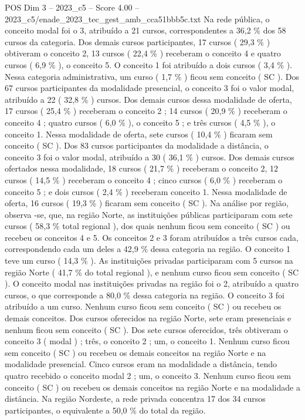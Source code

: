 \begin{textsample}{POS Dim 3 – 2023\_c5 – Score 4.00 – 2023\_c5/enade\_2023\_tec\_gest\_amb\_cca51bbb5c.txt}
Na rede pública, o conceito modal foi o 3, atribuído a 21 cursos, correspondentes a 36,2 \% dos 58 cursos da categoria.
Dos demais cursos participantes, 17 cursos ( 29,3 \% ) obtiveram o conceito 2, 13 cursos ( 22,4 \% ) receberam o conceito 4 e quatro cursos ( 6,9 \% ), o conceito 5.
O conceito 1 foi atribuído a dois cursos ( 3,4 \% ).
Nessa categoria administrativa, um curso ( 1,7 \% ) ficou sem conceito ( SC ).
Dos 67 cursos participantes da modalidade presencial, o conceito 3 foi o valor modal, atribuído a 22 ( 32,8 \% ) cursos.
Dos demais cursos dessa modalidade de oferta, 17 cursos ( 25,4 \% ) receberam o conceito 2 ; 14 cursos ( 20,9 \% ) receberam o conceito 4 ; quatro cursos ( 6,0 \% ), o conceito 5 ; e três cursos ( 4,5 \% ), o conceito 1.
Nessa modalidade de oferta, sete cursos ( 10,4 \% ) ficaram sem conceito ( SC ).
Dos 83 cursos participantes da modalidade a distância, o conceito 3 foi o valor modal, atribuído a 30 ( 36,1 \% ) cursos.
Dos demais cursos ofertados nessa modalidade, 18 cursos ( 21,7 \% ) receberam o conceito 2, 12 cursos ( 14,5 \% ) receberam o conceito 4 ; cinco cursos ( 6,0 \% ) receberam o conceito 5 ; e dois cursos ( 2,4 \% ) receberam conceito 1.
Nessa modalidade de oferta, 16 cursos ( 19,3 \% ) ficaram sem conceito ( SC ).
Na análise por região, observa -se, que, na região Norte, as instituições públicas participaram com sete cursos ( 58,3 \% total regional ), dos quais nenhum ficou sem conceito ( SC ) ou recebeu os conceitos 4 e 5.
Os conceitos 2 e 3 foram atribuídos a três cursos cada, correspondendo cada um deles a 42,9 \% dessa categoria na região.
O conceito 1 teve um curso ( 14,3 \% ).
As instituições privadas participaram com 5 cursos na região Norte ( 41,7 \% do total regional ), e nenhum curso ficou sem conceito ( SC ).
O conceito modal nas instituições privadas na região foi o 2, atribuído a quatro cursos, o que corresponde a 80,0 \% dessa categoria na região.
O conceito 3 foi atribuído a um curso.
Nenhum curso ficou sem conceito ( SC ) ou recebeu os demais conceitos.
Dos cursos oferecidos na região Norte, sete eram presenciais e nenhum ficou sem conceito ( SC ).
Dos sete cursos oferecidos, três obtiveram o conceito 3 ( modal ) ; três, o conceito 2 ; um, o conceito 1.
Nenhum curso ficou sem conceito ( SC ) ou recebeu os demais conceitos na região Norte e na modalidade presencial.
Cinco cursos eram na modalidade a distância, tendo quatro recebido o conceito modal 2 ; um, o conceito 3.
Nenhum curso ficou sem conceito ( SC ) ou recebeu os demais conceitos na região Norte e na modalidade a distância.
Na região Nordeste, a rede privada concentra 17 dos 34 cursos participantes, o equivalente a 50,0 \% do total da região.

\end{textsample}
